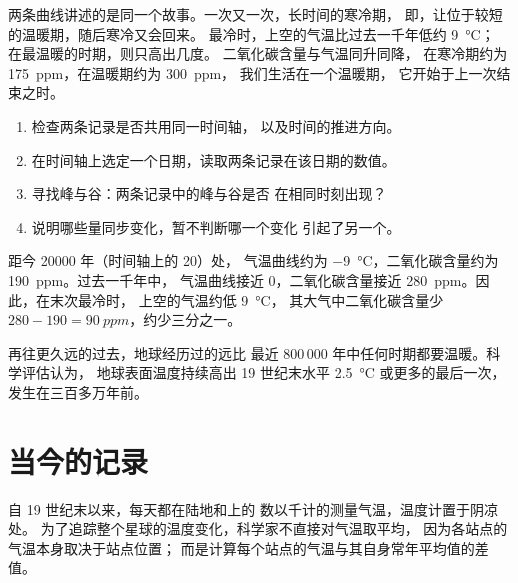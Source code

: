 两条曲线讲述的是同一个故事。一次又一次，长时间的寒冷期，
即，让位于较短的温暖期，随后寒冷又会回来。
最冷时，上空的气温比过去一千年低约 \qty{9}{\degreeCelsius}；
在最温暖的时期，则只高出几度。
二氧化碳含量与气温同升同降，
在寒冷期约为 \qty{175}{ppm}，在温暖期约为 \qty{300}{ppm}，
我们生活在一个温暖期，
它开始于上一次结束之时。

\begin{method}[并排阅读两条记录]
\begin{enumerate}
  \item 检查两条记录是否共用同一时间轴，
        以及时间的推进方向。
  \item 在时间轴上选定一个日期，读取两条记录在该日期的数值。
  \item 寻找峰与谷：两条记录中的峰与谷是否
        在相同时刻出现？
  \item 说明哪些量同步变化，暂不判断哪一个变化
        引起了另一个。
\end{enumerate}
\end{method}

\begin{example}[冰芯中的最后一次冰期]
距今 \num{20000} 年（时间轴上的 20）处，
气温曲线约为 \qty{-9}{\degreeCelsius}，二氧化碳含量约为
\qty{190}{ppm}。过去一千年中，
气温曲线接近 0，二氧化碳含量接近
\qty{280}{ppm}。因此，在末次最冷时，
上空的气温约低 \qty{9}{\degreeCelsius}，
其大气中二氧化碳含量少 $280 - 190 = \qty{90}{ppm}$，约少三分之一。
\end{example}

再往更久远的过去，地球经历过的远比
最近 800\,000 年中任何时期都要温暖。科学评估认为，
地球表面温度持续高出 19 世纪末水平 \qty{2.5}{\degreeCelsius} 或更多的最后一次，
发生在三百多万年前。

\section{当今的记录}

自 19 世纪末以来，每天都在陆地和上的
数以千计的测量气温，温度计置于阴凉处。
为了追踪整个星球的温度变化，科学家不直接对气温取平均，
因为各站点的气温本身取决于站点位置；
而是计算每个站点的气温与其自身常年平均值的差值。


